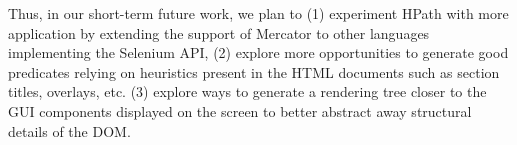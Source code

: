 Thus, in our short-term future work, we plan to (1) experiment HPath with more application by extending the support of Mercator to other languages implementing the Selenium API, (2) explore more opportunities to generate good predicates relying on heuristics present in the HTML documents such as section titles, overlays, etc. (3) explore ways to generate a rendering tree closer to the GUI components displayed on the screen to better abstract away structural details of the DOM.